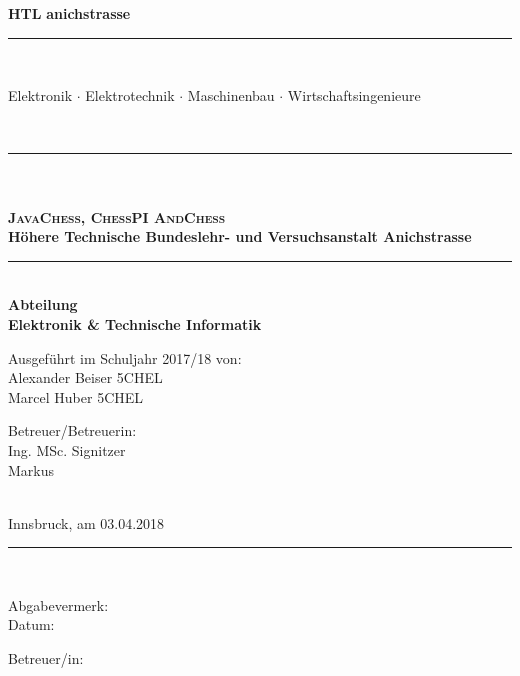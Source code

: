 \documentclass[12pt,a4paper]{article}
\begin{document}
\newcommand{\HtlHeader}[0]{%
	\hspace*{-11mm}%
	\raisebox{-1mm}{\logoB{0.12}}%
	\hspace*{2mm}%
	\parbox[b]{110mm}{\flushleft
		{\fontsize{20pt}{20pt}\selectfont\bf HTL}
		{\fontsize{16.2pt}{16.2pt}\selectfont\color{teal}\bf anichstrasse}
		\\[-4.05mm]{\color{darkgray}\rule{110mm}{0.5pt}}
		\\[-2.24mm]{\fontsize{7pt}{7pt}\selectfont\color{darkgray}
			Elektronik $\cdot$ Elektrotechnik $\cdot$
			Maschinenbau $\cdot$ Wirtschaftsingenieure
			\rule{0pt}{0mm}
		}
	}%
	\hspace*{5mm}%
	\\[-1.5mm]\rule{\textwidth}{0.5pt}
}%







\begin{titlepage}
 \begin{center}
   \begin{minipage}{\linewidth}
   \begin{center}
   \HtlHeader{}
	\vspace*{-10mm}
	{\fontsize{25pt}{25pt}\selectfont\bf \\[10mm]}
	\\[19mm]{\fontsize{20pt}{20pt}\selectfont\textbf{\textsc{JavaChess, ChessPI AndChess}}}
	\\[15mm]{\fontsize{12.4pt}{12.4pt}\selectfont\bf
		Höhere Technische Bundeslehr- und Versuchsanstalt Anichstrasse}
	\\[ 5mm]\rule{132mm}{1.0pt}
	\\[ 4mm]{\fontsize{12.4pt}{12.4pt}\selectfont\bf Abteilung}
	\\[ 5mm]{\fontsize{12.4pt}{12.4pt}\selectfont\bf Elektronik \& Technische Informatik}
	\\[24mm]{\hspace*{2mm}\parbox{154mm}{\fontsize{12.4pt}{12.4pt}\selectfont
	  \parbox[t]{75mm}{
		Ausgeführt im Schuljahr 2017/18 von:
		\\[5.0mm]Alexander Beiser 5CHEL
		\\[2.5mm]Marcel Huber 5CHEL 
	  }
	  \hspace*{6mm}
	  \parbox[t]{50mm}{
		Betreuer/Betreuerin:
		\\[5.0mm]Ing. MSc. Signitzer
		\\Markus
	  }
	  \\[14mm]{Innsbruck, am 03.04.2018}
	  \\[16mm]\rule{150mm}{0.5pt}
	  \\[ 8mm]
	  \parbox[t]{75mm}{
		Abgabevermerk:
		\\[3.25mm]Datum:
	  }
	  \hspace*{6mm}
	  \parbox[t]{50mm}{
		Betreuer/in:
	  }
	}}
   \end{center}\hfill
   \end{minipage}
 \end{center}
\end{titlepage}
\end{document}
